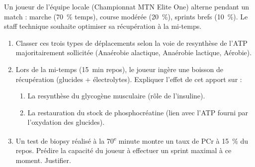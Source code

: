 \documentclass[11pt]{article}
\begin{document}
\begin{exercice}
Un joueur de l'équipe locale (Championnat MTN Elite One) alterne pendant un match : marche (\SI{70}{\%} temps), course modérée (\SI{20}{\%}), sprints brefs (\SI{10}{\%}). Le staff technique souhaite optimiser sa récupération à la mi-temps.
\begin{enumerate}
    \item Classer ces trois types de déplacements selon la voie de resynthèse de l'ATP majoritairement sollicitée (Anaérobie alactique, Anaérobie lactique, Aérobie).
    \item Lors de la mi-temps (\SI{15}{\minute} repos), le joueur ingère une boisson de récupération (glucides + électrolytes). Expliquer l'effet de cet apport sur : 
    \begin{enumerate}
        \item La resynthèse du glycogène musculaire (rôle de l'insuline).
        \item La restauration du stock de phosphocréatine (lien avec l'ATP fourni par l'oxydation des glucides).
    \end{enumerate}
    \item Un test de biopsy réalisé à la 70\textsuperscript{e} minute montre un taux de PCr à \SI{15}{\%} du repos. Prédire la capacité du joueur à effectuer un sprint maximal à ce moment. Justifier.
\end{enumerate}
\end{exercice}
\end{document}
